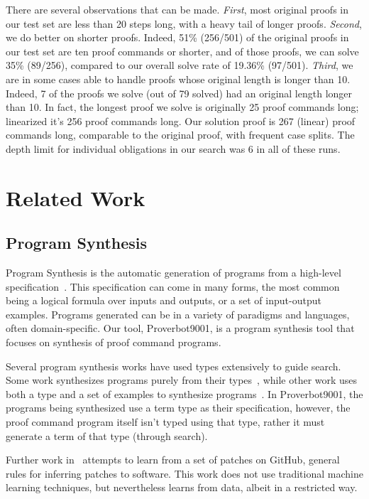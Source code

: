 \documentclass[sigplan,screen]{acmart}
\newcommand{\name}{Proverbot9001\xspace}
\renewcommand{\>}{\quad}
\begin{document}
There are several observations that can be made.
\emph{First}, most original proofs in our test set are less than 20 steps long, with a heavy tail of longer proofs.
\emph{Second}, we do better on shorter proofs.
Indeed, 51\% (256/501) of the original proofs in our test set are ten proof commands or shorter, and of those proofs, we can solve 35\% (89/256), compared to our overall solve rate of 19.36\% (97/501).
\emph{Third}, we are in some cases able to handle proofs whose original length is longer than 10. Indeed, 7 of the proofs we solve (out of 79 solved) had an original length longer than 10.
In fact, the longest proof we solve is originally 25 proof commands long;
  linearized it's 256 proof commands long.
Our solution proof is 267 (linear) proof commands long, comparable to the original proof,
  with frequent case splits.
The depth limit for individual obligations in our search was 6 in all of these runs.
 \section{Related Work}
\label{sec:relatedwork}

\subsection{Program Synthesis}
Program Synthesis is the automatic generation of programs
  from a high-level specification~\cite{dimensions-synthesis}.
This specification can come in many forms,
  the most common being a logical formula over inputs and outputs,
  or a set of input-output examples.
Programs generated can be in a variety of paradigms and languages,
  often domain-specific.
Our tool, \name{}, is a program synthesis tool
  that focuses on synthesis of proof command programs.

Several program synthesis works have used types extensively
  to guide search.
Some work synthesizes programs purely from their types~\cite{complete-completions},
  while other work uses both a type and a set of examples to synthesize programs~\cite{type-and-example, example-and-type}.
In \name{}, the programs being synthesized use a term type as their specification,
  however, the proof command program itself isn't typed using that type,
  rather it must generate a term of that type (through search).

Further work in~\cite{patch-generation} attempts to learn from a set of patches on GitHub,
  general rules for inferring patches to software.
This work does not use traditional machine learning techniques,
  but nevertheless learns from data, albeit in a restricted way.
\end{document}

